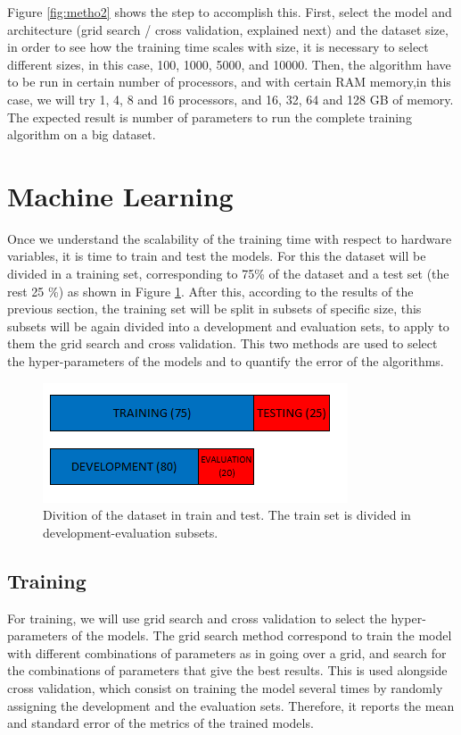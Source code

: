 Figure \ref{fig:metho2} shows the step to accomplish this. First, select the model and architecture (grid search / cross validation, explained next) and the dataset size, in order to see how the training time scales with size, it is necessary to select different sizes, in this case, 100, 1000, 5000, and 10000. Then, the algorithm have to be run in certain number of processors, and with certain RAM memory,in this case, we will try 1, 4, 8 and 16 processors, and 16, 32, 64 and 128 GB of memory. The expected result is number of parameters to run the complete training algorithm on a big dataset. 
\section{Machine Learning}
Once we understand the scalability of the training time with respect to hardware variables, it is time to train and test the models. For this the dataset will be divided in a training set, corresponding to 75\% of the dataset and a test set (the rest 25 \%) as shown in Figure \ref{fig:metho3}. After this, according to the results of the previous section, the training set will be split in subsets of specific size, this subsets will be again divided into a development and evaluation sets, to apply to them the grid search and cross validation. This two methods are used to select the hyper-parameters of the models and to quantify the error of the algorithms. 
\begin{figure}[h!]
	\centering
	\includegraphics[width=0.6\linewidth]{TeX_files/Imagenes/metho_3}
	\caption{Divition of the dataset in train and test. The train set is divided in development-evaluation subsets.}
	\label{fig:metho3}
\end{figure}
\subsection{Training}
For training, we will use grid search and cross validation to select the hyper-parameters of the models.
The grid search method correspond to train the model with different combinations of parameters as in going over a grid, and search for the combinations of parameters that give the best results. This is used alongside cross validation, which consist on training the model several times by randomly assigning the development and the evaluation sets. Therefore, it reports the mean and standard error of the metrics of the trained models.
